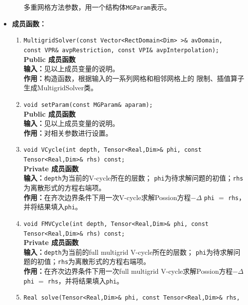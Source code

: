 \documentclass[a4paper,twoside]{ctexart}
\begin{document}
\begin{itemize}
\begin{enumerate}[(1)]
          多重网格方法参数，用一个结构体\texttt{MGParam}表示。
        \end{enumerate}
      \item \textbf{成员函数：}
        \begin{enumerate}[(1)]
        \item \texttt{MultigridSolver(const Vector<RectDomain<Dim> >\& avDomain,\\ const VPR\&
            avpRestriction, const VPI\& avpInterpolation);}\\
          \textbf{Public 成员函数}\\
          \textbf{输入：}见以上成员变量的说明。\\
          \textbf{作用：}构造函数，根据输入的一系列网格和相邻网格上的
          限制、插值算子生成MultigridSolver类。
          \item \texttt{void setParam(const MGParam\& aparam);}\\
          \textbf{Public 成员函数}\\
          \textbf{输入：}见以上成员变量的说明。\\
          \textbf{作用：}对相关参数进行设置。
          \item \texttt{void VCycle(int depth, Tensor<Real,Dim>\& phi, const Tensor<Real,Dim>\&
              rhs) const;}\\
          \textbf{Private 成员函数}\\
          \textbf{输入：}\texttt{depth}为当前的V-cycle所在的层数；
          \texttt{phi}为待求解问题的初值；\texttt{rhs}为离散形式的方程右端项。\\
          \textbf{作用：}在齐次边界条件下用一次V-cycle求解Possion方程$-\Delta$ \texttt{phi} $=$
          \texttt{rhs}，并将结果填入\texttt{phi}。
          \item \texttt{void FMVCycle(int depth, Tensor<Real,Dim>\& phi, const Tensor<Real,Dim>\&
               rhs) const;}\\
          \textbf{Private 成员函数}\\
          \textbf{输入：}\texttt{depth}为当前的full multigrid V-cycle所在的层数；
          \texttt{phi}为待求解问题的初值；\texttt{rhs}为离散形式的方程右端项。\\
          \textbf{作用：}在齐次边界条件下用一次full multigrid V-cycle求解Possion方程$-\Delta$ \texttt{phi} $=$
          \texttt{rhs}，并将结果填入\texttt{phi}。
        \item \texttt{Real solve(Tensor<Real,Dim>\& phi, const Tensor<Real,Dim>\& rhs,\\
}
\end{enumerate}
\end{itemize}
\end{document}

